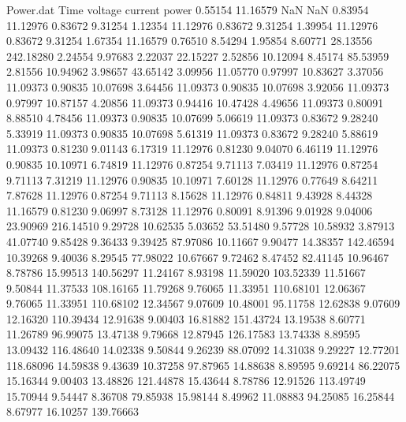 \begin{filecontents}{Power.dat}
Time voltage current power
   0.55154   11.16579        NaN        NaN
   0.83954   11.12976    0.83672    9.31254
   1.12354   11.12976    0.83672    9.31254
   1.39954   11.12976    0.83672    9.31254
   1.67354   11.16579    0.76510    8.54294
   1.95854    8.60771   28.13556  242.18280
   2.24554    9.97683    2.22037   22.15227
   2.52856   10.12094    8.45174   85.53959
   2.81556   10.94962    3.98657   43.65142
   3.09956   11.05770    0.97997   10.83627
   3.37056   11.09373    0.90835   10.07698
   3.64456   11.09373    0.90835   10.07698
   3.92056   11.09373    0.97997   10.87157
   4.20856   11.09373    0.94416   10.47428
   4.49656   11.09373    0.80091    8.88510
   4.78456   11.09373    0.90835   10.07699
   5.06619   11.09373    0.83672    9.28240
   5.33919   11.09373    0.90835   10.07698
   5.61319   11.09373    0.83672    9.28240
   5.88619   11.09373    0.81230    9.01143
   6.17319   11.12976    0.81230    9.04070
   6.46119   11.12976    0.90835   10.10971
   6.74819   11.12976    0.87254    9.71113
   7.03419   11.12976    0.87254    9.71113
   7.31219   11.12976    0.90835   10.10971
   7.60128   11.12976    0.77649    8.64211
   7.87628   11.12976    0.87254    9.71113
   8.15628   11.12976    0.84811    9.43928
   8.44328   11.16579    0.81230    9.06997
   8.73128   11.12976    0.80091    8.91396
   9.01928    9.04006   23.90969  216.14510
   9.29728   10.62535    5.03652   53.51480
   9.57728   10.58932    3.87913   41.07740
   9.85428    9.36433    9.39425   87.97086
  10.11667    9.90477   14.38357  142.46594
  10.39268    9.40036    8.29545   77.98022
  10.67667    9.72462    8.47452   82.41145
  10.96467    8.78786   15.99513  140.56297
  11.24167    8.93198   11.59020  103.52339
  11.51667    9.50844   11.37533  108.16165
  11.79268    9.76065   11.33951  110.68101
  12.06367    9.76065   11.33951  110.68102
  12.34567    9.07609   10.48001   95.11758
  12.62838    9.07609   12.16320  110.39434
  12.91638    9.00403   16.81882  151.43724
  13.19538    8.60771   11.26789   96.99075
  13.47138    9.79668   12.87945  126.17583
  13.74338    8.89595   13.09432  116.48640
  14.02338    9.50844    9.26239   88.07092
  14.31038    9.29227   12.77201  118.68096
  14.59838    9.43639   10.37258   97.87965
  14.88638    8.89595    9.69214   86.22075
  15.16344    9.00403   13.48826  121.44878
  15.43644    8.78786   12.91526  113.49749
  15.70944    9.54447    8.36708   79.85938
  15.98144    8.49962   11.08883   94.25085
  16.25844    8.67977   16.10257  139.76663

\end{filecontents}
